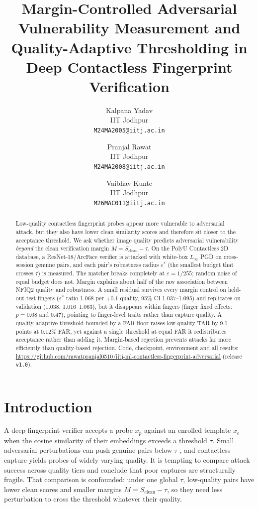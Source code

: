 \documentclass[10pt,twocolumn,letterpaper]{article}
\title{Margin-Controlled Adversarial Vulnerability Measurement and Quality-Adaptive Thresholding in Deep Contactless Fingerprint Verification}
\author{Kalpana Yadav\\
IIT Jodhpur\\
{\tt\small M24MA2005@iitj.ac.in}
\and
Pranjal Rawat\\
IIT Jodhpur\\
{\tt\small M24MA2008@iitj.ac.in}
\and
Vaibhav Kunte\\
IIT Jodhpur\\
{\tt\small M26MAC011@iitj.ac.in}
}
\newcommand{\eps}{\varepsilon}
\newcommand{\repo}{https://github.com/rawatpranjal0510/iitj-ml-contactless-fingerprint-adversarial}
\begin{document}
\maketitle

\begin{abstract}
Low-quality contactless fingerprint probes appear more vulnerable to adversarial attack, but they also have lower clean similarity scores and therefore sit closer to the acceptance threshold. We ask whether image quality predicts adversarial vulnerability \emph{beyond} the clean verification margin $M = S_{\mathrm{clean}} - \tau$. On the PolyU Contactless 2D database, a ResNet-18/ArcFace verifier is attacked with white-box $L_\infty$ PGD on cross-session genuine pairs, and each pair's robustness radius $\eps^*$ (the smallest budget that crosses $\tau$) is measured. The matcher breaks completely at $\eps = 1/255$; random noise of equal budget does not. Margin explains about half of the raw association between NFIQ2 quality and robustness. A small residual survives every margin control on held-out test fingers ($\eps^*$ ratio 1.068 per $+0.1$ quality, 95\% CI 1.037--1.095) and replicates on validation (1.038, 1.016--1.063), but it disappears within fingers (finger fixed effects: $p = 0.08$ and $0.47$), pointing to finger-level traits rather than capture quality. A quality-adaptive threshold bounded by a FAR floor raises low-quality TAR by 9.1 points at 0.12\% FAR, yet against a single threshold at equal FAR it redistributes acceptance rather than adding it. Margin-based rejection prevents attacks far more efficiently than quality-based rejection. Code, checkpoint, environment and all results: \url{\repo} (release \texttt{v1.0}).
\end{abstract}


\section{Introduction}
A deep fingerprint verifier accepts a probe $x_p$ against an enrolled template $x_e$ when the cosine similarity of their embeddings exceeds a threshold $\tau$. Small adversarial perturbations can push genuine pairs below $\tau$ \cite{szegedy2014,goodfellow2015,madry2018}, and contactless capture yields probes of widely varying quality. It is tempting to compare attack success across quality tiers and conclude that poor captures are structurally fragile. That comparison is confounded: under one global $\tau$, low-quality pairs have lower clean scores and smaller margins $M = S_{\mathrm{clean}} - \tau$, so they need less perturbation to cross the threshold whatever their quality.
\end{document}

